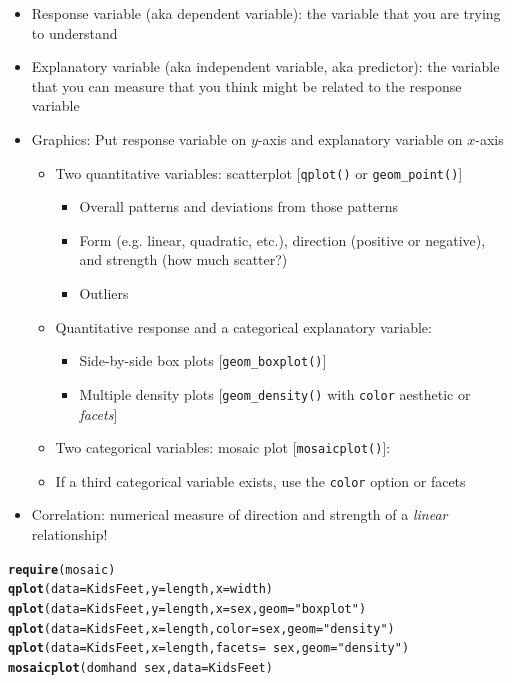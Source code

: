 \documentclass[10pt]{article}\usepackage[]{graphicx}\usepackage[]{color}
\makeatletter
\newcommand{\hlstr}[1]{\textcolor[rgb]{0.192,0.494,0.8}{#1}}%
\newcommand{\hlopt}[1]{\textcolor[rgb]{0,0,0}{#1}}%
\newcommand{\hlstd}[1]{\textcolor[rgb]{0.345,0.345,0.345}{#1}}%
\newcommand{\hlkwc}[1]{\textcolor[rgb]{0.333,0.667,0.333}{#1}}%
\newcommand{\hlkwd}[1]{\textcolor[rgb]{0.737,0.353,0.396}{\textbf{#1}}}%
\newenvironment{kframe}{%
 \def\at@end@of@kframe{}%
 \ifinner\ifhmode%
  \def\at@end@of@kframe{\end{minipage}}%
  \begin{minipage}{\columnwidth}%
 \fi\fi%
 \def\FrameCommand##1{\hskip\@totalleftmargin \hskip-\fboxsep
 \colorbox{shadecolor}{##1}\hskip-\fboxsep
     \hskip-\linewidth \hskip-\@totalleftmargin \hskip\columnwidth}%
 \MakeFramed {\advance\hsize-\width
   \@totalleftmargin\z@ \linewidth\hsize
   \@setminipage}}%
 {\par\unskip\endMakeFramed%
 \at@end@of@kframe}
\newenvironment{knitrout}{}{} %
\newcommand{\cmd}[1]{\texttt{#1}}
\makeatother
\begin{document}
\begin{itemize}
  \itemsep0em
  \item Response variable (aka dependent variable): the variable that you are trying to understand
  \item Explanatory variable (aka independent variable, aka predictor): the variable that you can measure that you think might be related to the response variable
  \item Graphics: Put response variable on $y$-axis and explanatory variable on $x$-axis
  \begin{itemize}
    \item Two quantitative variables: scatterplot [\cmd{qplot()} or \cmd{geom\_point()}]  
    \begin{itemize}
      \item Overall patterns and deviations from those patterns
      \item Form (e.g. linear, quadratic, etc.), direction (positive or negative), and strength (how much scatter?)
      \item Outliers
    \end{itemize}
    \item Quantitative response and a categorical explanatory variable:
    \begin{itemize}
      \item Side-by-side box plots [\cmd{geom\_boxplot()}]
      \item Multiple density plots [\cmd{geom\_density()} with \cmd{color} aesthetic or \emph{facets}]
    \end{itemize}
    \item Two categorical variables: mosaic plot [\cmd{mosaicplot()}]: 
    \item If a third categorical variable exists, use the \cmd{color} option or facets
  \end{itemize}
  \item Correlation: numerical measure of direction and strength of a \emph{linear} relationship!
\end{itemize}

\begin{knitrout}
\color{fgcolor}\begin{kframe}
\begin{alltt}
\hlkwd{require}\hlstd{(mosaic)}
\hlkwd{qplot}\hlstd{(}\hlkwc{data} \hlstd{= KidsFeet,} \hlkwc{y} \hlstd{= length,} \hlkwc{x} \hlstd{= width)}
\hlkwd{qplot}\hlstd{(}\hlkwc{data} \hlstd{= KidsFeet,} \hlkwc{y} \hlstd{= length,} \hlkwc{x} \hlstd{= sex,} \hlkwc{geom} \hlstd{=} \hlstr{"boxplot"}\hlstd{)}
\hlkwd{qplot}\hlstd{(}\hlkwc{data} \hlstd{= KidsFeet,} \hlkwc{x} \hlstd{= length,} \hlkwc{color} \hlstd{= sex,} \hlkwc{geom} \hlstd{=} \hlstr{"density"}\hlstd{)}
\hlkwd{qplot}\hlstd{(}\hlkwc{data} \hlstd{= KidsFeet,} \hlkwc{x} \hlstd{= length,} \hlkwc{facets} \hlstd{=} \hlopt{~}\hlstd{sex,} \hlkwc{geom} \hlstd{=} \hlstr{"density"}\hlstd{)}
\hlkwd{mosaicplot}\hlstd{(domhand} \hlopt{~} \hlstd{sex,} \hlkwc{data} \hlstd{= KidsFeet)}
\end{alltt}
\end{kframe}
\end{knitrout}
\end{document}
